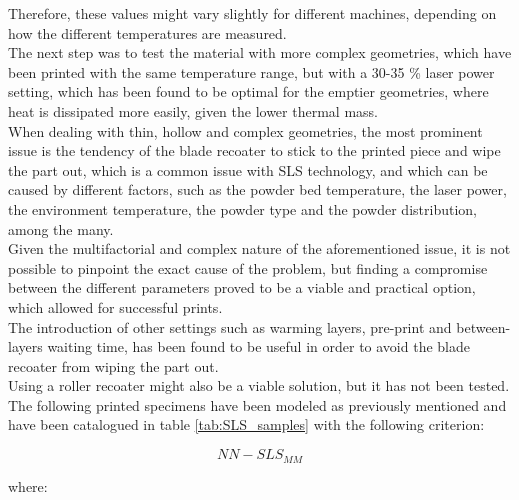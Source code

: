 \documentclass{article}
\begin{document}
          Therefore, these values might vary slightly for different machines, depending on how the different 
          temperatures are measured. \\ 
  
          The next step was to test the material with more complex geometries, which have been printed with the same 
          temperature range, but with a 30-35 \% laser power setting, which has been found to be optimal for the 
          emptier geometries, where heat is dissipated more easily, given the lower thermal mass. \\ 
  
          When dealing with thin, hollow and complex geometries, the most prominent issue is the tendency of the 
          blade recoater to stick to the printed piece and wipe the part out, which is a common 
          issue with SLS technology, and which 
          can be caused by different factors, such as the powder bed temperature, the laser power, the 
          environment temperature, the powder type and the powder distribution, among the many. \\ 
  
          Given the multifactorial and complex nature of the aforementioned issue, it is not possible to 
          pinpoint the exact cause of the problem, but finding a compromise between the 
          different parameters proved to be a viable and practical option, which allowed for successful prints. \\
          
          The introduction of other settings such as warming layers, pre-print 
          and between-layers waiting time, has been found to be useful in order to avoid 
          the blade recoater from wiping the part out. \\
  
          Using a roller recoater might also be a viable solution, but it has not been tested. \\ 
  
          The following printed specimens have been modeled as previously mentioned and 
          have been catalogued in table \ref{tab:SLS_samples} with the following criterion: 
  
          \begin{equation}
              NN-SLS_{MM}
              \label{eq:SLS_specimen_notation}
          \end{equation}
  
          where: 
  
\end{document}
